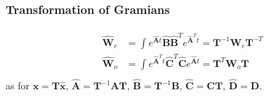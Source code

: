 \documentclass[letterpaper,10pt,english]{jupyterBook}
\begin{document}
\subsubsection*{Transformation of Gramians}
\begin{equation*}
\begin{split}\begin{aligned}
  \hat{\mathbf{W}}_c & = \int e^{\hat{\mathbf{A}}t} \hat{\mathbf{B}} \hat{\mathbf{B}}^T e^{\hat{\mathbf{A}}^T t} = \mathbf{T}^{-1} \mathbf{W}_c \mathbf{T}^{-T} \\
  \hat{\mathbf{W}}_o & = \int e^{\hat{\mathbf{A}}^T t} \hat{\mathbf{C}}^T \hat{\mathbf{C}} e^{\hat{\mathbf{A}} t} = \mathbf{T}^{T} \mathbf{W}_o \mathbf{T} \\
\end{aligned}\end{split}
\end{equation*}
\sphinxAtStartPar
as for \(\mathbf{x} = \mathbf{T} \hat{\mathbf{x}}\), \(\hat{\mathbf{A}} = \mathbf{T}^{-1} \mathbf{A} \mathbf{T}\), \(\hat{\mathbf{B}} = \mathbf{T}^{-1} \mathbf{B}\), \(\hat{\mathbf{C}} = \mathbf{C} \mathbf{T}\), \(\hat{\mathbf{D}} = \mathbf{D}\).
\end{document}

